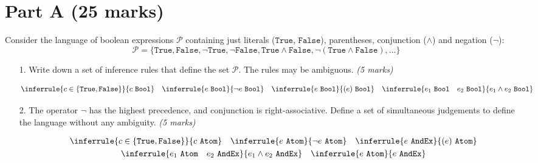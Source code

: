 \documentclass[a4paper,answers]{exam}
\begin{document}
\section*{Part A (25 marks)}
\noindent Consider the language of boolean expressions $\mathcal{P}$ containing just literals ($\mathtt{True}$, $\mathtt{False}$), parentheses,
conjunction ($\wedge$) and negation ($\neg$):
$$ \mathcal{P} = \{ \mathtt{True}, \mathtt{False}, \neg \mathtt{True}, \neg \mathtt{False}, \mathtt{True} \wedge \mathtt{False},  \neg(\mathtt{True} \wedge \mathtt{False}), \dots \} $$

\begin{itemize}
    \item[1.] Write down a set of inference rules that define the set $\mathcal{P}$. The rules may be ambiguous. \textit{(5 marks)}
\begin{solution}
     \begin{gather*}
        \inferrule{c \in \{\mathtt{True}, \mathtt{False}\}}{c\ \mathtt{Bool}}\quad  
        \inferrule{e\ \mathtt{Bool}}{\neg e\ \mathtt{Bool}}\quad
        \inferrule{e\ \mathtt{Bool}}{(e)\ \mathtt{Bool}}\quad 
        \inferrule{e_1\ \mathtt{Bool}\quad e_2\ \mathtt{Bool}}{e_1 \land e_2\ \mathtt{Bool}}\quad
    \end{gather*}
\end{solution}

\item[2.] The operator $\neg$ has the highest precedence, and conjunction is right-associative.
Define a set of simultaneous judgements to define the language without any ambiguity. \textit{(5 marks)}
\begin{solution}
     \begin{gather*}
        \inferrule{c \in \{\mathtt{True}, \mathtt{False}\}}{c\ \mathtt{Atom}}\quad 
        \inferrule{e\ \mathtt{Atom}}{\neg e\ \mathtt{Atom}}\quad
        \inferrule{e\ \mathtt{AndEx}}{(e)\ \mathtt{Atom}}\\
        \inferrule{e_1\ \mathtt{Atom}\quad e_2\ \mathtt{AndEx}}{e_1 \land e_2\ \mathtt{AndEx}}\quad 
        \inferrule{e\ \mathtt{Atom}}{e\ \mathtt{AndEx}}
    \end{gather*}
\end{solution}


\end{itemize}
\end{document}
